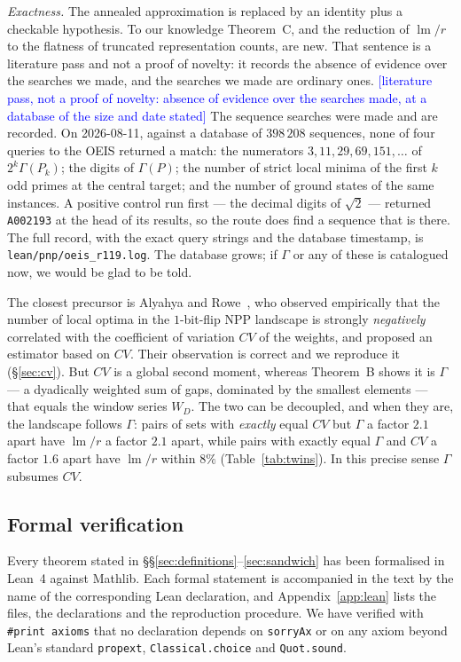 \documentclass[11pt,a4paper]{article}
\theoremstyle{plain}
\theoremstyle{definition}
\theoremstyle{remark}
\DeclareMathOperator{\lm}{lm}
\newcommand{\Lean}[1]{\texttt{#1}}
\newcommand{\STATUS}[1]{\textcolor{blue}{\textsf{[#1]}}}
\begin{document}
\emph{Exactness.} The annealed approximation is replaced by an identity plus a
checkable hypothesis. To our knowledge Theorem~C, and the reduction of
$\lm/r$ to the flatness of truncated representation counts, are new. That
sentence is a literature pass and not a proof of novelty: it records the absence
of evidence over the searches we made, and the searches we made are ordinary
ones. \STATUS{literature pass, not a proof of novelty: absence of evidence over
the searches made, at a database of the size and date stated}
The sequence searches were made and are recorded. On 2026-08-11, against a
database of $398\,208$ sequences, none of four queries to the OEIS returned a
match: the numerators $3,11,29,69,151,\dots$ of $2^{k}\Gamma(P_k)$; the digits
of $\Gamma(P)$; the number of strict local minima of the first $k$ odd primes at
the central target; and the number of ground states of the same instances. A
positive control run first --- the decimal digits of $\sqrt2$ --- returned
\texttt{A002193} at the head of its results, so the route does find a sequence
that is there. The full record, with the exact query strings and the database
timestamp, is \texttt{lean/pnp/oeis\_r119.log}. The database grows; if $\Gamma$
or any of these is catalogued now, we would be glad to be told.

The closest precursor is Alyahya and Rowe~\cite{AR14}, who observed empirically
that the number of local optima in the $1$-bit-flip NPP landscape is strongly
\emph{negatively} correlated with the coefficient of variation $CV$ of the
weights, and proposed an estimator based on $CV$. Their observation is correct
and we reproduce it (\S\ref{sec:cv}). But $CV$ is a global second moment,
whereas Theorem~B shows it is $\Gamma$ --- a dyadically weighted sum of gaps,
dominated by the smallest elements --- that equals the window series $W_D$.
The two can be decoupled, and when they are, the landscape follows $\Gamma$:
pairs of sets with \emph{exactly} equal $CV$ but $\Gamma$ a factor $2.1$ apart
have $\lm/r$ a factor $2.1$ apart, while pairs with exactly equal $\Gamma$
and $CV$ a factor $1.6$ apart have $\lm/r$ within $8\%$
(Table~\ref{tab:twins}). In this precise sense $\Gamma$ subsumes $CV$.

\subsection{Formal verification}

Every theorem stated in \S\S\ref{sec:definitions}--\ref{sec:sandwich} has been
formalised in Lean~4 against Mathlib. Each formal statement is accompanied in
the text by the name of the corresponding Lean declaration, and
Appendix~\ref{app:lean} lists the files, the declarations and the reproduction
procedure. We have verified with \Lean{\#print axioms} that no declaration
depends on \Lean{sorryAx} or on any axiom beyond Lean's standard
\Lean{propext}, \Lean{Classical.choice} and \Lean{Quot.sound}.
\end{document}
